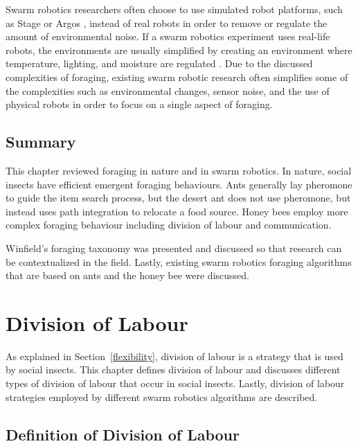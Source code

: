 Swarm robotics researchers often choose to use simulated robot platforms, such as Stage \cite{vaughan2008massively} or Argos \cite{pinciroli2011argos}, instead of real robots in order to remove or regulate the amount of environmental noise. If a swarm robotics experiment uses real-life robots, the environments are usually simplified by creating an environment where temperature, lighting, and moisture are regulated \cite{labella2006division,nouyan2006group}. Due to the discussed complexities of foraging, existing swarm robotic research often simplifies some of the complexities such as environmental changes, sensor noise, and the use of physical robots in order to focus on a single aspect of foraging. 

\section{Summary}
\label{foraging:summary}

This chapter reviewed foraging in nature and in swarm robotics. In nature, social insects have efficient emergent foraging behaviours. Ants generally lay pheromone to guide the item search process, but the desert ant does not use pheromone, but instead uses path integration to relocate a food source. Honey bees employ more complex foraging behaviour including division of labour and communication. 

Winfield's foraging taxonomy was presented and discussed so that research can be contextualized in the field. Lastly, existing swarm robotics foraging algorithms that are based on ants and the honey bee were discussed.

\chapter{Division of Labour}
\label{chap:divisionoflabour}


As explained in Section~\ref{flexibility}, division of labour is a strategy that is used by social insects. This chapter defines division of labour and discusses different types of division of labour that occur in social insects. Lastly, division of labour strategies employed by different swarm robotics algorithms are described. 

\section{Definition of Division of Labour}
\label{division:definition}

